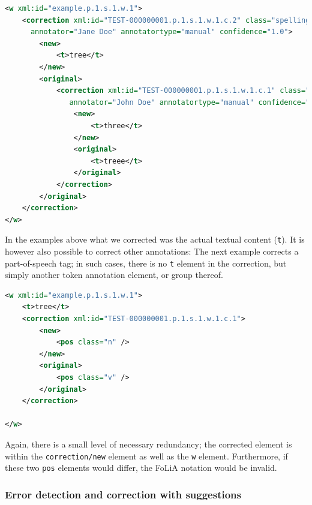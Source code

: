 \documentclass[a4paper,12pt]{report}
\begin{document}

\begin{lstlisting}[language=xml]
<w xml:id="example.p.1.s.1.w.1">
    <correction xml:id="TEST-000000001.p.1.s.1.w.1.c.2" class="spelling" 
      annotator="Jane Doe" annotatortype="manual" confidence="1.0">
        <new>
            <t>tree</t>
        </new>
        <original>
            <correction xml:id="TEST-000000001.p.1.s.1.w.1.c.1" class="spelling"
               annotator="John Doe" annotatortype="manual" confidence="0.6">
                <new>
                    <t>three</t>
                </new>
                <original>
                    <t>treee</t>
                </original>
            </correction>
        </original>
    </correction>
</w>
\end{lstlisting}

In the examples above what we corrected was the actual textual content (\texttt{t}). It is however also possible to correct other annotations: The next example corrects a part-of-speech tag; in such cases, there is no \texttt{t} element in the correction, but simply another token annotation element, or group thereof.

\begin{lstlisting}[language=xml]
<w xml:id="example.p.1.s.1.w.1">
    <t>tree</t>
    <correction xml:id="TEST-000000001.p.1.s.1.w.1.c.1">
        <new>
            <pos class="n" />
        </new>
        <original>
            <pos class="v" />
        </original>
    </correction>
    
</w>    
\end{lstlisting}

Again, there is a small level of necessary redundancy; the corrected element is within the \texttt{correction/new} element as well as the \texttt{w} element. Furthermore, if these two \texttt{pos} elements would differ, the FoLiA notation would be invalid.

\subsubsection{Error detection and correction with suggestions} 
\end{document}
